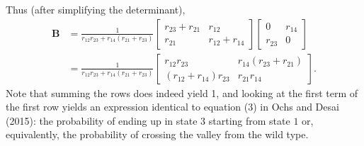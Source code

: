 \documentclass[11pt]{revtex4}
\begin{document}
Thus (after simplifying the determinant),
\begin{align}
\textbf{B} & =
\frac{1}{r_{12}r_{23} + r_{14}(r_{21}+r_{23})}
\begin{bmatrix}
r_{23} + r_{21} & r_{12}\\
r_{21} & r_{12} + r_{14}
\end{bmatrix}
\begin{bmatrix}
0 & r_{14} \\
r_{23} & 0
\end{bmatrix}
\nonumber \\
& =
\frac{1}{r_{12}r_{23} + r_{14}(r_{21}+r_{23})}
\begin{bmatrix}
r_{12}r_{23} & r_{14}(r_{23}+r_{21}) \\
(r_{12}+r_{14})r_{23} & r_{21}r_{14}
\end{bmatrix}.
\end{align}
Note that summing the rows does indeed yield 1, and looking at the first term of the first row yields an expression identical to equation (3) in Ochs and Desai (2015): the probability of ending up in state $3$ starting from state $1$ or, equivalently, the probability of crossing the valley from the wild type.
\end{document}
